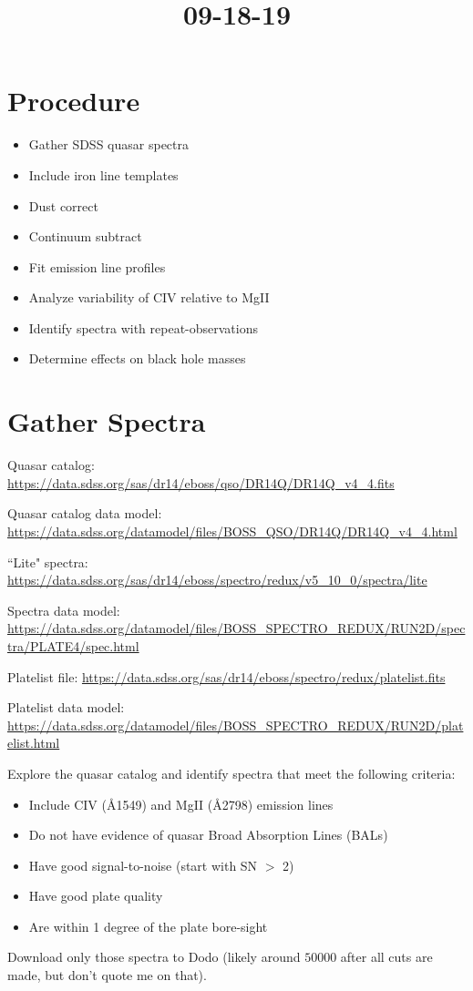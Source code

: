 \documentclass[12pt]{article}
\begin{document}
\title{09-18-19}
\author{}
\maketitle
    \section{Procedure}
        \begin{itemize}
            \item Gather SDSS quasar spectra
            \item Include iron line templates
            \item Dust correct
            \item Continuum subtract
            \item Fit emission line profiles
            \item Analyze variability of CIV relative to MgII
            \item Identify spectra with repeat-observations
            \item Determine effects on black hole masses
        \end{itemize}

    \section{Gather Spectra}
        Quasar catalog: \url{https://data.sdss.org/sas/dr14/eboss/qso/DR14Q/DR14Q_v4_4.fits}

        Quasar catalog data model: \url{https://data.sdss.org/datamodel/files/BOSS_QSO/DR14Q/DR14Q_v4_4.html}

        ``Lite" spectra: \url{https://data.sdss.org/sas/dr14/eboss/spectro/redux/v5_10_0/spectra/lite}

        Spectra data model: \url{https://data.sdss.org/datamodel/files/BOSS_SPECTRO_REDUX/RUN2D/spectra/PLATE4/spec.html}

        Platelist file: \url{https://data.sdss.org/sas/dr14/eboss/spectro/redux/platelist.fits}

        Platelist data model: \url{https://data.sdss.org/datamodel/files/BOSS_SPECTRO_REDUX/RUN2D/platelist.html}

        Explore the quasar catalog and identify spectra that meet the following criteria:

        \begin{itemize}
            \item Include CIV (\AA 1549) and MgII (\AA 2798) emission lines
            \item Do not have evidence of quasar Broad Absorption Lines (BALs)
            \item Have good signal-to-noise (start with SN $>$ 2)
            \item Have good plate quality
            \item Are within 1 degree of the plate bore-sight
        \end{itemize}

        Download only those spectra to Dodo (likely around $50000$ after all cuts are made, but don't quote me on that).
\end{document}
